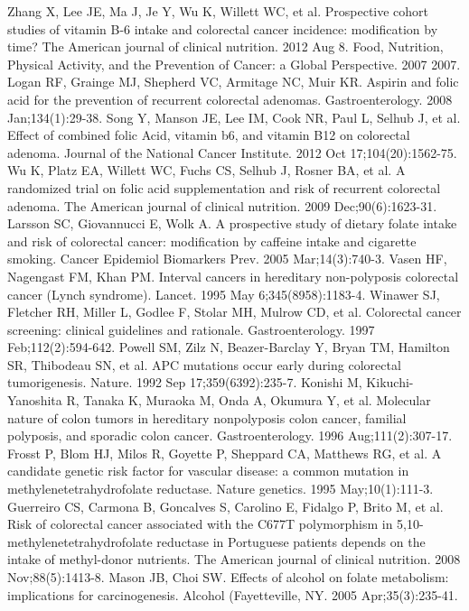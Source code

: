 \begin{thebibliography}{12}
		Zhang X, Lee JE, Ma J, Je Y, Wu K, Willett WC, et al. Prospective cohort studies of vitamin B-6 intake and colorectal cancer incidence: modification by time? The American journal of clinical nutrition. 2012 Aug 8. 
		Food, Nutrition, Physical Activity, and the Prevention of Cancer: a Global Perspective. 2007 2007. 
		Logan RF, Grainge MJ, Shepherd VC, Armitage NC, Muir KR. Aspirin and folic acid for the prevention of recurrent colorectal adenomas. Gastroenterology. 2008 Jan;134(1):29-38. 
		Song Y, Manson JE, Lee IM, Cook NR, Paul L, Selhub J, et al. Effect of combined folic Acid, vitamin b6, and vitamin B12 on colorectal adenoma. Journal of the National Cancer Institute. 2012 Oct 17;104(20):1562-75. 
		Wu K, Platz EA, Willett WC, Fuchs CS, Selhub J, Rosner BA, et al. A randomized trial on folic acid supplementation and risk of recurrent colorectal adenoma. The American journal of clinical nutrition. 2009 Dec;90(6):1623-31. 
		Larsson SC, Giovannucci E, Wolk A. A prospective study of dietary folate intake and risk of colorectal cancer: modification by caffeine intake and cigarette smoking. Cancer Epidemiol Biomarkers Prev. 2005 Mar;14(3):740-3. 
		Vasen HF, Nagengast FM, Khan PM. Interval cancers in hereditary non-polyposis colorectal cancer (Lynch syndrome). Lancet. 1995 May 6;345(8958):1183-4. 
		Winawer SJ, Fletcher RH, Miller L, Godlee F, Stolar MH, Mulrow CD, et al. Colorectal cancer screening: clinical guidelines and rationale. Gastroenterology. 1997 Feb;112(2):594-642. 
		Powell SM, Zilz N, Beazer-Barclay Y, Bryan TM, Hamilton SR, Thibodeau SN, et al. APC mutations occur early during colorectal tumorigenesis. Nature. 1992 Sep 17;359(6392):235-7. 
		Konishi M, Kikuchi-Yanoshita R, Tanaka K, Muraoka M, Onda A, Okumura Y, et al. Molecular nature of colon tumors in hereditary nonpolyposis colon cancer, familial polyposis, and sporadic colon cancer. Gastroenterology. 1996 Aug;111(2):307-17. 
		Frosst P, Blom HJ, Milos R, Goyette P, Sheppard CA, Matthews RG, et al. A candidate genetic risk factor for vascular disease: a common mutation in methylenetetrahydrofolate reductase. Nature genetics. 1995 May;10(1):111-3. 
		Guerreiro CS, Carmona B, Goncalves S, Carolino E, Fidalgo P, Brito M, et al. Risk of colorectal cancer associated with the C677T polymorphism in 5,10-methylenetetrahydrofolate reductase in Portuguese patients depends on the intake of methyl-donor nutrients. The American journal of clinical nutrition. 2008 Nov;88(5):1413-8. 
		Mason JB, Choi SW. Effects of alcohol on folate metabolism: implications for carcinogenesis. Alcohol (Fayetteville, NY. 2005 Apr;35(3):235-41. 
\end{thebibliography} 
